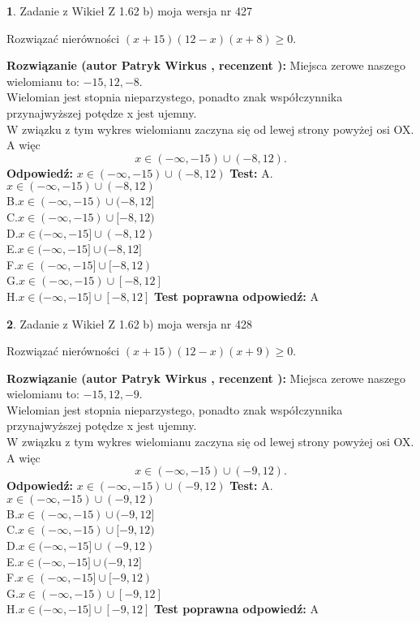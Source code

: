 \documentclass[12pt, a4paper]{article}
\theoremstyle{definition} %
\newtheorem{zad}{}
\newcommand{\zadStart}[1]{\begin{zad}#1\newline}
\newcommand{\zadStop}{\end{zad}}
\newcommand{\rozwStart}[2]{\noindent \textbf{Rozwiązanie (autor #1 , recenzent #2): }\newline}
\newcommand{\rozwStop}{\newline}
\newcommand{\odpStart}{\noindent \textbf{Odpowiedź:}\newline}
\newcommand{\odpStop}{\newline}
\newcommand{\testStart}{\noindent \textbf{Test:}\newline}
\newcommand{\testStop}{\newline}
\newcommand{\kluczStart}{\noindent \textbf{Test poprawna odpowiedź:}\newline}
\newcommand{\kluczStop}{\newline}
\begin{document}
\zadStart{Zadanie z Wikieł Z 1.62 b) moja wersja nr 427}

Rozwiązać nierówności $(x+15)(12-x)(x+8)\ge0$.
\zadStop
\rozwStart{Patryk Wirkus}{}
Miejsca zerowe naszego wielomianu to: $-15, 12, -8$.\\
Wielomian jest stopnia nieparzystego, ponadto znak współczynnika przy\linebreak najwyższej potędze x jest ujemny.\\ W związku z tym wykres wielomianu zaczyna się od lewej strony powyżej osi OX. A więc $$x \in (-\infty,-15) \cup (-8,12).$$
\rozwStop
\odpStart
$x \in (-\infty,-15) \cup (-8,12)$
\odpStop
\testStart
A.$x \in (-\infty,-15) \cup (-8,12)$\\
B.$x \in (-\infty,-15) \cup (-8,12]$\\
C.$x \in (-\infty,-15) \cup [-8,12)$\\
D.$x \in (-\infty,-15] \cup (-8,12)$\\
E.$x \in (-\infty,-15] \cup (-8,12]$\\
F.$x \in (-\infty,-15] \cup [-8,12)$\\
G.$x \in (-\infty,-15) \cup [-8,12]$\\
H.$x \in (-\infty,-15] \cup [-8,12]$
\testStop
\kluczStart
A
\kluczStop



\zadStart{Zadanie z Wikieł Z 1.62 b) moja wersja nr 428}

Rozwiązać nierówności $(x+15)(12-x)(x+9)\ge0$.
\zadStop
\rozwStart{Patryk Wirkus}{}
Miejsca zerowe naszego wielomianu to: $-15, 12, -9$.\\
Wielomian jest stopnia nieparzystego, ponadto znak współczynnika przy\linebreak najwyższej potędze x jest ujemny.\\ W związku z tym wykres wielomianu zaczyna się od lewej strony powyżej osi OX. A więc $$x \in (-\infty,-15) \cup (-9,12).$$
\rozwStop
\odpStart
$x \in (-\infty,-15) \cup (-9,12)$
\odpStop
\testStart
A.$x \in (-\infty,-15) \cup (-9,12)$\\
B.$x \in (-\infty,-15) \cup (-9,12]$\\
C.$x \in (-\infty,-15) \cup [-9,12)$\\
D.$x \in (-\infty,-15] \cup (-9,12)$\\
E.$x \in (-\infty,-15] \cup (-9,12]$\\
F.$x \in (-\infty,-15] \cup [-9,12)$\\
G.$x \in (-\infty,-15) \cup [-9,12]$\\
H.$x \in (-\infty,-15] \cup [-9,12]$
\testStop
\kluczStart
A
\kluczStop
\end{document}
